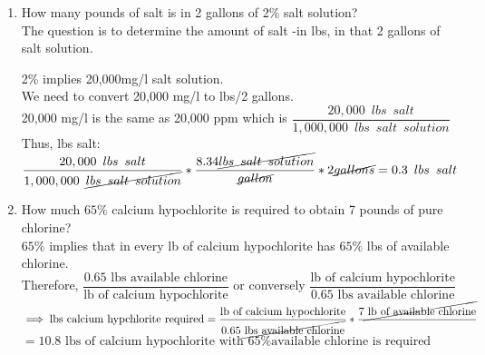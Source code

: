 \documentclass{article}
\begin{document}
\begin{enumerate}
\item How many pounds of salt is in 2 gallons of 2\% salt solution?\\
\vspace{0.2cm}
The question is to determine the amount of salt -in lbs, in that 2 gallons of salt solution.\\
\vspace{0.2cm}

2\% implies 20,000mg/l salt solution.\\

\vspace{0.2cm}
We need to convert 20,000 mg/l to lbs/2 gallons.\\
\vspace{0.2cm}
20,000 mg/l is the same as 20,000 ppm which is $\dfrac{20,000 \enspace lbs \enspace salt}{1,000,000 \enspace lbs \enspace salt \enspace solution}$\\
\vspace{0.2cm}
Thus, lbs salt:\\
\vspace{0.2cm}
$\dfrac{20,000 \enspace lbs \enspace salt}{1,000,000 \enspace \cancel{lbs \enspace salt \enspace solution}}*\dfrac{8.34 \cancel{lbs \enspace salt \enspace solution}}{\cancel{gallon}}*2 \cancel{gallons} =0.3 \enspace lbs \enspace salt$
\vspace{0.2cm}
\item How much $65 \%$ calcium hypochlorite is required to obtain 7 pounds of pure chlorine?\\
$65 \%$ implies that in every lb of calcium hypochlorite has $65 \%$ lbs of available chlorine.\\
\vspace{0.2cm}
Therefore, $\dfrac{0.65 \textrm{ lbs available chlorine}}{\textrm{lb of calcium hypochlorite}} $ or conversely $\dfrac{\textrm{lb of calcium hypochlorite}}{0.65 \textrm{ lbs available chlorine}}$\\
\vspace{0.2cm}
$\implies{\textrm{lbs calcium hypchlorite required}}=\dfrac{\textrm{lb of calcium hypochlorite}}{0.65 \cancel{\textrm{ lbs available chlorine}}}*\dfrac{7\cancel{\textrm{ lb of available chlorine}}}{}$\\
\vspace{0.2cm}
$=\boxed{10.8 \textrm{ lbs of calcium hypochlorite with } 65\%\textrm{available chlorine is required}}$
\end{enumerate}
\end{document}
